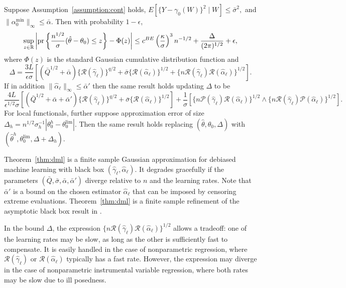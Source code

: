 \begin{theorem}\label{thm:dml}Suppose Assumption~\ref{assumption:cont} holds,
$
E[\{Y-\gamma_0(W)\}^2 \mid W]\leq \bar{\sigma}^2,$
and
$\|\alpha^{\min}_0\|_{\infty}\leq\bar{\alpha}.
$
Then with probability $1-\epsilon$,
$$
\sup_{z\in\mathbb{R}} \left| \text{\normalfont pr} \left\{\frac{n^{1/2}}{\sigma}(\hat{\theta}-\theta_0)\leq z\right\}-\Phi(z)\right|\leq c^{BE}\left(\frac{\kappa}{\sigma}\right)^3 n^{-1/2}+\frac{\Delta}{(2\pi)^{1/2}}+\epsilon,
$$
where $\Phi(z)$ is the standard Gaussian cumulative distribution function and
$$
\Delta=\frac{3 L}{\epsilon   \sigma}\left[(\bar{Q}^{1/2}+\bar{\alpha})\{\mathcal{R}(\hat{\gamma}_{\ell})\}^{q/2}+\bar{\sigma}\{\mathcal{R}(\hat{\alpha}_{\ell})\}^{1/2}+\{n \mathcal{R}(\hat{\gamma}_{\ell}) \mathcal{R}(\hat{\alpha}_{\ell}) \}^{1/2}\right].
$$
If in addition $\|\hat{\alpha}_{\ell}\|_{\infty}\leq\bar{\alpha}'$ then the same result holds updating $\Delta$ to be
$$
\frac{4 L}{\epsilon^{1/2}  \sigma}\left[(\bar{Q}^{1/2}+\bar{\alpha}+\bar{\alpha}')\{\mathcal{R}(\hat{\gamma}_{\ell})\}^{q/2}
    +\bar{\sigma}\{\mathcal{R}(\hat{\alpha}_{\ell})\}^{1/2}\right]+\frac{1}{\sigma}[\{n\mathcal{P}(\hat{\gamma}_{\ell})\mathcal{R}(\hat{\alpha}_{\ell})\}^{1/2} \wedge \{n\mathcal{R}(\hat{\gamma}_{\ell})\mathcal{P}(\hat{\alpha}_{\ell})\}^{1/2}].
$$
For local functionals, further suppose approximation error of size $\Delta_h=
n^{1/2} \sigma_h^{-1}|\theta_0^h-\theta_0^{\lim}|$. Then the same result holds replacing $(\hat{\theta},\theta_0,\Delta)$ with $(\hat{\theta}^h,\theta_0^{\lim},\Delta+\Delta_h)$.
\end{theorem}

Theorem~\ref{thm:dml} is a finite sample Gaussian approximation for debiased machine learning with black box $(\hat{\gamma}_{\ell},\hat{\alpha}_{\ell})$. It degrades gracefully if the parameters $(\bar{Q},\bar{\sigma},\bar{\alpha},\bar{\alpha}')$ diverge relative to $n$ and the learning rates. Note that $\bar{\alpha}'$ is a bound on the chosen estimator $\hat{\alpha}_{\ell}$ that can be imposed by censoring extreme evaluations. Theorem~\ref{thm:dml} is a finite sample refinement of the asymptotic black box result in \cite{chernozhukov2016locally}. 

In the bound $\Delta$, the expression $\{n \mathcal{R}(\hat{\gamma}_{\ell}) \mathcal{R}(\hat{\alpha}_{\ell})\}^{1/2}$ allows a tradeoff: one of the learning rates may be slow, as long as the other is sufficiently fast to compensate. It is easily handled in the case of nonparametric regression, where $\mathcal{R}(\hat{\gamma}_{\ell})$ or $\mathcal{R}(\hat{\alpha}_{\ell})$ typically has a fast rate. However, the expression may diverge in the case of nonparametric instrumental variable regression, where both rates may be slow due to ill posedness. 

